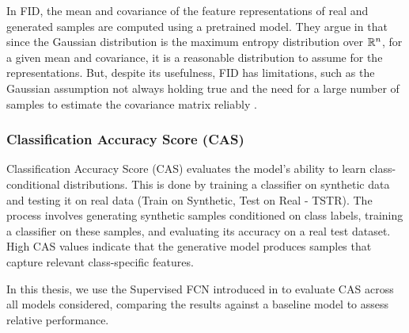 \documentclass[../../thesis.tex]{subfiles}
\begin{document}
In FID, the mean and covariance of the feature representations of real and generated samples are computed using a pretrained model. They argue in \cite{heusel2018gans} that since the Gaussian distribution is the maximum entropy distribution over $\mathbb{R}^n$, for a given mean and covariance, it is a reasonable distribution to assume for the representations. But, despite its usefulness, FID has limitations, such as the Gaussian assumption not always holding true and the need for a large number of samples to estimate the covariance matrix reliably \cite{jayasumana2024rethinking, chong2020effectively}.

\subsubsection{Classification Accuracy Score (CAS)}
Classification Accuracy Score (CAS) evaluates the model's ability to learn class-conditional distributions. This is done by training a classifier on synthetic data and testing it on real data (Train on Synthetic, Test on Real - TSTR). The process involves generating synthetic samples conditioned on class labels, training a classifier on these samples, and evaluating its accuracy on a real test dataset. High CAS values indicate that the generative model produces samples that capture relevant class-specific features.\newline

In this thesis, we use the Supervised FCN introduced in \cite{TimeVQVAE} to evaluate CAS across all models considered, comparing the results against a baseline model to assess relative performance.
\end{document}

